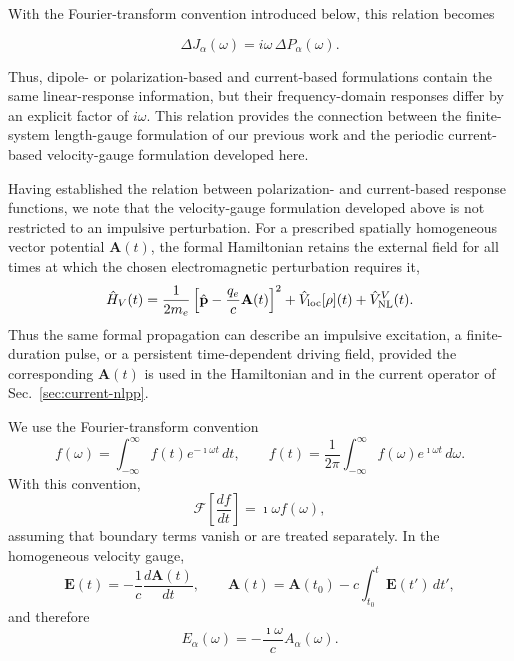 With the Fourier-transform convention introduced below, this relation
becomes

\begin{equation}
\Delta J_{\alpha}(\omega)
=
i\omega\,\Delta P_{\alpha}(\omega).
\label{eq:current_polarization_frequency}
\end{equation}

Thus, dipole- or polarization-based and current-based formulations
contain the same linear-response information, but their frequency-domain
responses differ by an explicit factor of $i\omega$.  This relation
provides the connection between the finite-system length-gauge
formulation of our previous work and the periodic current-based
velocity-gauge formulation developed here.


Having established the relation between polarization- and
current-based response functions, we note that the velocity-gauge
formulation developed above is not restricted to an impulsive
perturbation.
For a prescribed spatially homogeneous vector
potential $\mathbf A(t)$, the formal Hamiltonian retains the external
field for all times at which the chosen electromagnetic perturbation
requires it,
\begin{equation}
  \hat H_V(t)
  =
  \frac{1}{2m_e}
  \left[
    \hat{\mathbf p}
    -
    \frac{q_e}{c}\mathbf A(t)
  \right]^2
  + \hat V_{\rm loc}[\rho](t)
  + \hat V_{\rm NL}^{V}(t).
  \label{eq:optical_response_vg_hamiltonian}
\end{equation}
Thus the same formal propagation can describe an impulsive excitation,
a finite-duration pulse, or a persistent time-dependent driving field,
provided the corresponding $\mathbf A(t)$ is used in the Hamiltonian and
in the current operator of Sec.~\ref{sec:current-nlpp}.

We use the Fourier-transform convention
\begin{equation}
  f(\omega)
  =
  \int_{-\infty}^{\infty}
  f(t)e^{-\imath\omega t}\,dt,
  \qquad
  f(t)
  =
  \frac{1}{2\pi}
  \int_{-\infty}^{\infty}
  f(\omega)e^{\imath\omega t}\,d\omega .
  \label{eq:fourier_convention}
\end{equation}
With this convention,
\begin{equation}
  \mathcal F\!\left[
    \frac{df}{dt}
  \right]
  =
  \imath\omega f(\omega),
  \label{eq:fourier_derivative_convention}
\end{equation}
assuming that boundary terms vanish or are treated separately.  In the
homogeneous velocity gauge,
\begin{equation}
  \mathbf E(t)
  =
  -\frac{1}{c}\frac{d\mathbf A(t)}{dt},
  \qquad
  \mathbf A(t)
  =
  \mathbf A(t_0)
  -
  c\int_{t_0}^{t}\mathbf E(t')\,dt',
  \label{eq:e_a_time_relation_optical}
\end{equation}
and therefore
\begin{equation}
  E_\alpha(\omega)
  =
  -\frac{\imath\omega}{c}
  A_\alpha(\omega).
  \label{eq:e_a_frequency_relation_optical}
\end{equation}

